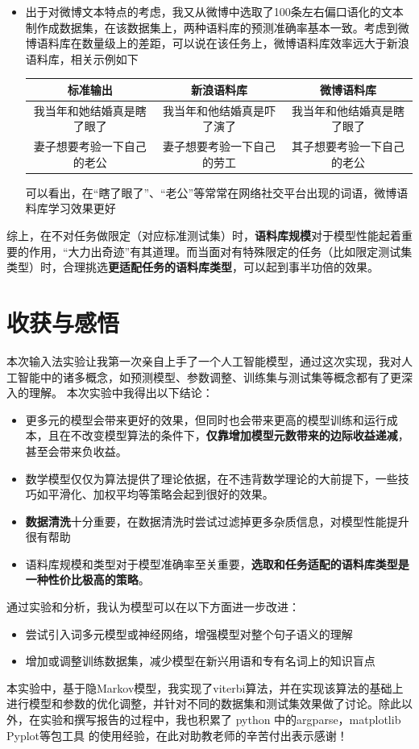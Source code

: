 \documentclass{article}
\begin{document}
\begin{spacing}{1.1}
\begin{itemize}
	\item 出于对微博文本特点的考虑，我又从微博中选取了100条左右偏口语化的文本制作成数据集，在该数据集上，两种语料库的预测准确率基本一致。考虑到微博语料库在数量级上的差距，可以说在该任务上，微博语料库效率远大于新浪语料库，相关示例如下
	\begin {center}
	\begin{tabular}{|c|c|c|}
		\textbf{标准输出} & \textbf{新浪语料库} & \textbf{微博语料库} \\
		\hline
		我当年和她结婚真是瞎了眼了 & 我当年和他结婚真是吓了演了 & 我当年和他结婚真是瞎了眼了 \\
		\hline
		妻子想要考验一下自己的老公  & 妻子想要考验一下自己的劳工 & 其子想要考验一下自己的老公\\
	\end{tabular}
\end{center}
可以看出，在“瞎了眼了”、“老公”等常常在网络社交平台出现的词语，微博语料库学习效果更好
\end{itemize}	

综上，在不对任务做限定（对应标准测试集）时，\textbf{语料库规模}对于模型性能起着重要的作用，“大力出奇迹”有其道理。而当面对有特殊限定的任务（比如限定测试集类型）时，合理挑选\textbf{更适配任务的语料库类型}，可以起到事半功倍的效果。

\section{收获与感悟}
\hspace{1.4em}
本次输入法实验让我第一次亲自上手了一个人工智能模型，通过这次实现，我对人工智能中的诸多概念，如预测模型、参数调整、训练集与测试集等概念都有了更深入的理解。
本次实验中我得出以下结论：
\begin{itemize}
	\item 更多元的模型会带来更好的效果，但同时也会带来更高的模型训练和运行成本，且在不改变模型算法的条件下，\textbf{仅靠增加模型元数带来的边际收益递减}，甚至会带来负收益。
	\item 数学模型仅仅为算法提供了理论依据，在不违背数学理论的大前提下，一些技巧如平滑化、加权平均等策略会起到很好的效果。
	\item \textbf{数据清洗}十分重要，在数据清洗时尝试过滤掉更多杂质信息，对模型性能提升很有帮助
	\item 语料库规模和类型对于模型准确率至关重要，\textbf{选取和任务适配的语料库类型是一种性价比极高的策略}。
\end{itemize}


通过实验和分析，我认为模型可以在以下方面进一步改进：
\begin{itemize}
	\item 尝试引入词多元模型或神经网络，增强模型对整个句子语义的理解
	\item 增加或调整训练数据集，减少模型在新兴用语和专有名词上的知识盲点
\end{itemize}	
	 
本实验中，基于隐Markov模型，我实现了viterbi算法，并在实现该算法的基础上进行模型和参数的优化调整，并针对不同的数据集和测试集效果做了讨论。除此以外，在实验和撰写报告的过程中，我也积累了 python 中的argparse，matplotlib Pyplot等包工具
的使用经验，在此对助教老师的辛苦付出表示感谢！

\end{spacing}
\end{document}
